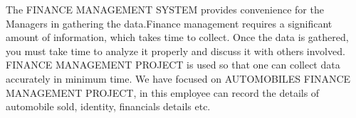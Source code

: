 \begin{Large}
\end{Large}
\vskip 0.1in
The FINANCE MANAGEMENT SYSTEM provides convenience for the Managers in gathering the data.Finance management requires a significant amount of information, which takes time to collect. Once the data is gathered, you must take time to analyze it properly and discuss it with others involved. FINANCE MANAGEMENT PROJECT is used so that one can collect data accurately in minimum time. We have focused on AUTOMOBILES FINANCE MANAGEMENT PROJECT, in this employee can record the details of automobile sold, identity, financials details etc.

